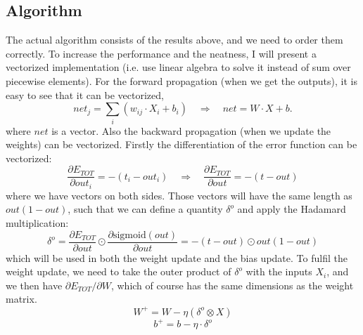 \subsection{Algorithm}
The actual algorithm consists of the results above, and we need to order them correctly. To increase the performance and the neatness, I will present a vectorized implementation (i.e. use linear algebra to solve it instead of sum over piecewise elements). For the forward propagation (when we get the outputs), it is easy to see that it can be vectorized,
\begin{equation}
net_j = \sum_i (w_{ij}\cdot X_i + b_i)\quad\Rightarrow\quad net = W\cdot X + b.
\end{equation}
where $net$ is a vector. Also the backward propagation (when we update the weights) can be vectorized. Firstly the differentiation of the error function can be vectorized:
\begin{equation}
\frac{\partial E_{TOT}}{\partial out_i}=-(t_i-out_i)\quad\Rightarrow\quad \frac{\partial E_{TOT}}{\partial out}=-(t-out)
\end{equation}
where we have vectors on both sides. Those vectors will have the same length as $out(1-out)$, such that we can define a quantity $\delta^o$ and apply the Hadamard multiplication:
\begin{equation}
\delta^o = \frac{\partial E_{TOT}}{\partial out}\odot\frac{\partial\text{sigmoid}(out)}{\partial out}=-(t-out)\odot out(1-out)
\end{equation}
which will be used in both the weight update and the bias update. To fulfil the weight update, we need to take the outer product of $\delta^o$ with the inputs $X_i$, and we then have $\partial E_{TOT}/\partial W$, which of course has the same dimensions as the weight matrix. 
\begin{equation}
W^+ = W - \eta(\delta^o\otimes X)
\end{equation}
\begin{equation}
b^+ = b - \eta\cdot\delta^o
\end{equation}

